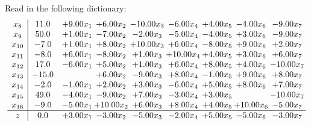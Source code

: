 \documentclass[9pt]{article}
\begin{document}
Read in the following dictionary:
\[\begin{array}{c| c c@{\hskip 2pt} c@{\hskip 2pt} c@{\hskip 2pt} c@{\hskip 2pt} c@{\hskip 2pt} c@{\hskip 2pt} c@{\hskip 2pt} }
 x_{8}   &  11.0 & +  9.00 x_{1} & +  6.00 x_{2} & -10.00 x_{3} & -6.00 x_{4} & +  4.00 x_{5} & -4.00 x_{6} & -9.00 x_{7}\\
 x_{9}   &  50.0 & +  1.00 x_{1} & -7.00 x_{2} & -2.00 x_{3} & -5.00 x_{4} & -4.00 x_{5} & +  3.00 x_{6} & -9.00 x_{7}\\
 x_{10}   &  -7.0 & +  1.00 x_{1} & +  8.00 x_{2} & + 10.00 x_{3} & +  6.00 x_{4} & -8.00 x_{5} & +  9.00 x_{6} & +  2.00 x_{7}\\
 x_{11}   &  -8.0 & +  6.00 x_{1} & -8.00 x_{2} & +  1.00 x_{3} & + 10.00 x_{4} & +  4.00 x_{5} & +  3.00 x_{6} & +  6.00 x_{7}\\
 x_{12}   &  17.0 & -6.00 x_{1} & +  5.00 x_{2} & +  1.00 x_{3} & +  6.00 x_{4} & +  8.00 x_{5} & +  4.00 x_{6} & -10.00 x_{7}\\
 x_{13}   &  -15.0  &   & +  6.00 x_{2} & -9.00 x_{3} & +  8.00 x_{4} & -1.00 x_{5} & +  9.00 x_{6} & +  8.00 x_{7}\\
 x_{14}   &  -2.0 & -1.00 x_{1} & +  2.00 x_{2} & +  3.00 x_{3} & -6.00 x_{4} & +  5.00 x_{5} & +  8.00 x_{6} & +  7.00 x_{7}\\
 x_{15}   &  49.0 & -4.00 x_{1} & -9.00 x_{2} & +  7.00 x_{3} & -3.00 x_{4} & +  3.00 x_{5} &   & -10.00 x_{7}\\
 x_{16}   &  -9.0 & -5.00 x_{1} & + 10.00 x_{2} & +  6.00 x_{3} & +  8.00 x_{4} & +  4.00 x_{5} & + 10.00 x_{6} & -5.00 x_{7}\\
\hline
z    &  0.0 & +  3.00 x_{1} & -3.00 x_{2} & -5.00 x_{3} & -2.00 x_{4} & +  5.00 x_{5} & -5.00 x_{6} & -3.00 x_{7}\\
\end{array}\]
\end{document}
